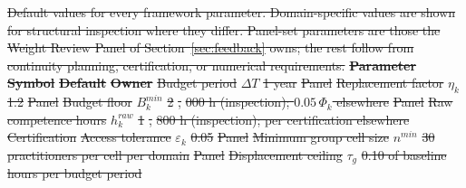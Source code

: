\documentclass[utf8]{FrontiersinHarvard}
\providecommand{\DIFdel}[1]{{\protect\color{red}\sout{#1}}}                      %
\providecommand{\DIFdelFL}[1]{\DIFdel{#1}} %
\begin{document}
{%
\DIFdelFL{Default values for every framework parameter. Domain-specific values are shown for structural inspection where they differ. Panel-set parameters are those the Weight Review Panel of Section~\ref{sec:feedback} owns; the rest follow from continuity planning, certification, or numerical requirements.}}
\textbf{\DIFdelFL{Parameter}} %
\textbf{\DIFdelFL{Symbol}} %
\textbf{\DIFdelFL{Default}} %
\textbf{\DIFdelFL{Owner}}%
\DIFdelFL{Budget period }%
\DIFdelFL{$\Delta T$ }%
\DIFdelFL{1 year }%
\DIFdelFL{Panel}%
\DIFdelFL{Replacement factor }%
\DIFdelFL{$\eta_k$ }%
\DIFdelFL{1.2 }%
\DIFdelFL{Panel}%
\DIFdelFL{Budget floor }%
\DIFdelFL{$B^{min}_k$ }%
\DIFdelFL{2}%
\DIFdelFL{,}%
\DIFdelFL{000 h (inspection); $0.05\,\Phi_k$ elsewhere }%
\DIFdelFL{Panel}%
\DIFdelFL{Raw competence hours }%
\DIFdelFL{$h^{raw}_k$ }%
\DIFdelFL{1}%
\DIFdelFL{,}%
\DIFdelFL{800 h (inspection); per certification elsewhere }%
\DIFdelFL{Certification}%
\DIFdelFL{Access tolerance }%
\DIFdelFL{$\varepsilon_k$ }%
\DIFdelFL{0.05 }%
\DIFdelFL{Panel}%
\DIFdelFL{Minimum group cell size }%
\DIFdelFL{$n^{min}$ }%
\DIFdelFL{30 practitioners per cell per domain }%
\DIFdelFL{Panel}%
\DIFdelFL{Displacement ceiling }%
\DIFdelFL{$\tau_g$ }%
\DIFdelFL{0.10 of baseline hours per budget period }%
\end{document}
